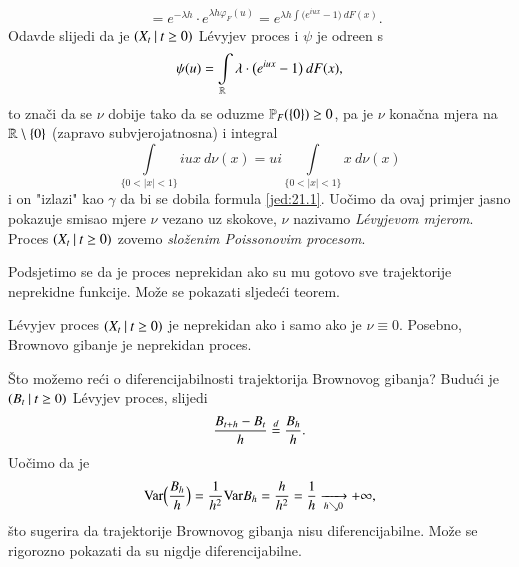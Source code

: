 \begin{pr}
\begin{equation}
\begin{aligned}
            &= e^{-\lambda h} \cdot e^{\lambda h \varphi_F (u)} = e^{\lambda h \int \big( e^{i u x} - 1 \big) \: d F (x)}.
        \end{aligned}
    \end{equation}
    Odavde slijedi da je $({X_t} \: | \: {t \geq 0})$ L\' evyjev proces i $\psi$ je odre\dj en s
    \begin{equation}    \label{jed:21.13}
        \psi (u) = \int\limits_{\mathbb{R}} \lambda \cdot \big( e^{i u x} - 1 \big) \: d F (x),
    \end{equation}
    to zna\v ci da se $\nu$ dobije tako da se oduzme $\mathbb{P}_F (\{0\}) \geq 0$, pa je $\nu$ kona\v cna mjera na $\mathbb{R} \setminus \{0\}$ (zapravo subvjerojatnosna) i integral
    \begin{equation*}
        \int\limits_{\{ 0 < |x| < 1 \}} i u x \: d \nu (x) = u i \int\limits_{\{ 0 < |x| < 1 \}} x \: d \nu (x)
    \end{equation*}
    i on "izlazi" kao $\gamma$ da bi se dobila formula \eqref{jed:21.1}.
    Uo\v cimo da ovaj primjer jasno pokazuje smisao mjere $\nu$ vezano uz skokove, $\nu$ nazivamo \emph{L\' evyjevom mjerom}.
    Proces $({X_t} \: | \: {t \geq 0})$ zovemo \emph{slo\v zenim Poissonovim procesom}.
\end{pr}

Podsjetimo se da je proces neprekidan ako su mu gotovo sve trajektorije neprekidne funkcije.
Mo\v ze se pokazati sljede\' ci teorem.

\begin{tm}  \label{tm:21.14}
    L\' evyjev proces $({X_t} \: | \: {t \geq 0})$ je neprekidan ako i samo ako je $\nu \equiv 0$.
    Posebno, Brownovo gibanje je neprekidan proces.
\end{tm}

\begin{nap} \label{nap:21.15}
    \v Sto mo\v zemo re\' ci o diferencijabilnosti trajektorija Brownovog gibanja?
    Budu\' ci je $({B_t} \: | \: {t \geq 0})$ L\' evyjev proces, slijedi
    \begin{equation*}
        \frac{B_{t + h} - B_t}{h} \overset{d}{=} \frac{B_h}{h}.
    \end{equation*}
    Uo\v cimo da je
    \begin{equation*}
        \mathrm{Var} \Big( \frac{B_h}{h} \Big) = \frac{1}{h^2} \mathrm{Var} B_h = \frac{h}{h^2} = \frac{1}{h} \xrightarrow[h \searrow 0]{} +\infty,
    \end{equation*}
    \v sto sugerira da trajektorije Brownovog gibanja nisu diferencijabilne.
    Mo\v ze se rigorozno pokazati da su nigdje diferencijabilne.
\end{nap}

